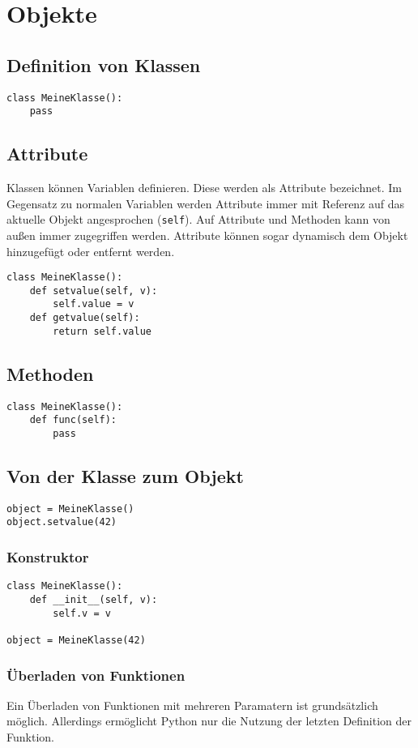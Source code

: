 \chapter{Objekte}
\section{Definition von Klassen}
\begin{lstlisting}
class MeineKlasse():
    pass
\end{lstlisting}
\section{Attribute}
Klassen können Variablen definieren. Diese werden als Attribute bezeichnet. Im Gegensatz zu normalen Variablen werden Attribute immer mit Referenz auf das aktuelle Objekt angesprochen (\texttt{self}). Auf Attribute und Methoden kann von außen immer zugegriffen werden. Attribute können sogar dynamisch dem Objekt hinzugefügt oder entfernt werden.
\begin{lstlisting}
class MeineKlasse():
    def setvalue(self, v):
        self.value = v
    def getvalue(self):
        return self.value
\end{lstlisting}
\section{Methoden}
\begin{lstlisting}
class MeineKlasse():
    def func(self):
        pass
\end{lstlisting}
\section{Von der Klasse zum Objekt}
\begin{lstlisting}
object = MeineKlasse()
object.setvalue(42)
\end{lstlisting}
\subsection{Konstruktor}
\begin{lstlisting}
class MeineKlasse():
    def __init__(self, v):
        self.v = v
        
object = MeineKlasse(42)
\end{lstlisting}
\subsection{Überladen von Funktionen}
Ein Überladen von Funktionen mit mehreren Paramatern ist grundsätzlich möglich. Allerdings ermöglicht Python nur die Nutzung der letzten Definition der Funktion.
